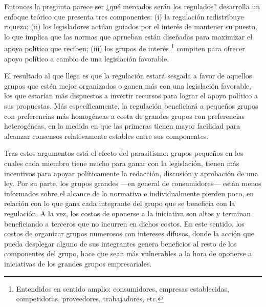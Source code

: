 \documentclass[
  12pt,
  spanish,
]{book}
\begin{document}
Entonces la pregunta parece ser ¿qué mercados serán los regulados?
\citet{Peltzman1976} desarrolla un enfoque teórico que presenta tres
componentes: (i) la regulación redistribuye riqueza; (ii) los
legisladores actúan guiados por el interés de mantener su puesto, lo que
implica que las normas que aprueban están diseñadas para maximizar el
apoyo político que reciben; (iii) los grupos de interés \footnote{Entendidos
  en sentido amplio: consumidores, empresas establecidas, competidoras,
  proveedores, trabajadores, etc.} compiten para ofrecer apoyo político
a cambio de una legislación favorable.

El resultado al que llega es que la regulación estará sesgada a favor de
aquellos grupos que estén mejor organizados o ganen más con una
legislación favorable, los que estarían más dispuestos a invertir
recursos para lograr el apoyo político a sus propuestas. Más
específicamente, la regulación beneficiará a pequeños grupos con
preferencias más homogéneas a costa de grandes grupos con preferencias
heterogéneas, en la medida en que las primeras tienen mayor facilidad
para alcanzar consensos relativamente estables entre sus componentes.

Tras estos argumentos está el efecto del parasitismo: grupos pequeños en
los cuales cada miembro tiene mucho para ganar con la legislación,
tienen más incentivos para apoyar políticamente la redacción, discusión
y aprobación de una ley. Por su parte, los grupos grandes ---en general
de consumidores--- están menos informados sobre el alcance de la
normativa e individualmente pierden poco, en relación con lo que gana
cada integrante del grupo que se beneficia con la regulación. A la vez,
los costos de oponerse a la iniciativa son altos y terminan beneficiando
a terceros que no incurren en dichos costos. En este sentido, los costos
de organizar grupos numerosos con intereses difusos, donde la acción que
pueda desplegar alguno de sus integrantes genera beneficios al resto de
los componentes del grupo, hace que sean más vulnerables a la hora de
oponerse a iniciativas de los grandes grupos empresariales.
\end{document}
